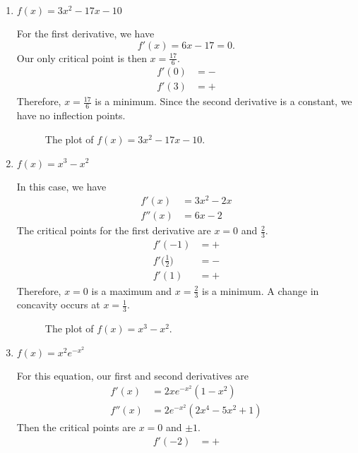 \begin{enumerate}
\begin{enumerate}[label = (\alph*)]
\begin{figure}[H]
    \end{figure}
  \item
    \(f(x) = 3x^2 - 17x - 10\)
    \par\smallskip
    For the first derivative, we have
    \[
    f'(x) = 6x - 17 = 0.
    \]
    Our only critical point is then \(x = \frac{17}{6}\).
    \begin{align*}
      f'(0) &= -\\
      f'(3) &= +
    \end{align*}
    Therefore, \(x = \frac{17}{6}\) is a minimum.
    Since the second derivative is a constant, we have no inflection points.
    \begin{figure}[H]
      \centering
      
      \caption{The plot of \(f(x) = 3x^2 - 17x -10\).}
    \end{figure}
  \item
    \(f(x) = x^3 - x^2\)
    \par\smallskip
    In this case, we have
    \begin{align*}
      f'(x) &= 3x^2 - 2x\\
      f''(x) &= 6x - 2
    \end{align*}
    The critical points for the first derivative are \(x = 0\) and
    \(\frac{2}{3}\).
    \begin{align*}
      f'(-1) &= +\\
      f'\big(\frac{1}{2}\big) &= -\\
      f'(1) &= +
    \end{align*}
    Therefore, \(x = 0\) is a maximum and \(x = \frac{2}{3}\) is a minimum.
    A change in concavity occurs at \(x = \frac{1}{3}\).
    \begin{figure}[H]
      \centering
      
      \caption{The plot of \(f(x) = x^3 - x^2\).}
    \end{figure}
  \item
    \(f(x) = x^2e^{-x^2}\)
    \par\smallskip
    For this equation, our first and second derivatives are
    \begin{align*}
      f'(x) &= 2xe^{-x^2}(1 - x^2)\\
      f''(x) &= 2e^{-x^2}(2x^4 - 5x^2 + 1)
    \end{align*}
    Then the critical points are \(x = 0\) and \(\pm 1\).
    \begin{align*}
      f'(-2) &= +\\

\end{align*}
\end{enumerate}
\end{enumerate}
